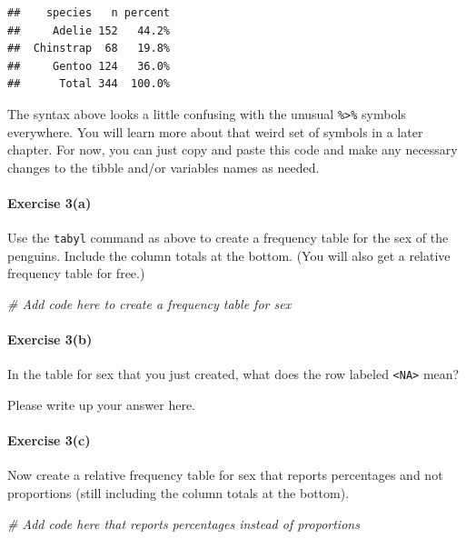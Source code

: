 \documentclass[
]{book}
\newenvironment{Shaded}{\begin{snugshade}}{\end{snugshade}}
\newcommand{\CommentTok}[1]{\textcolor[rgb]{0.56,0.35,0.01}{\textit{#1}}}
\begin{document}
\begin{verbatim}
##    species   n percent
##     Adelie 152   44.2%
##  Chinstrap  68   19.8%
##     Gentoo 124   36.0%
##      Total 344  100.0%
\end{verbatim}

The syntax above looks a little confusing with the unusual \texttt{\%\textgreater{}\%} symbols everywhere. You will learn more about that weird set of symbols in a later chapter. For now, you can just copy and paste this code and make any necessary changes to the tibble and/or variables names as needed.

\hypertarget{exercise-3a}{%
\paragraph*{Exercise 3(a)}\label{exercise-3a}}

Use the \texttt{tabyl} command as above to create a frequency table for the sex of the penguins. Include the column totals at the bottom. (You will also get a relative frequency table for free.)

\begin{Shaded}
\begin{Highlighting}[]
\CommentTok{\# Add code here to create a frequency table for sex}
\end{Highlighting}
\end{Shaded}

\hypertarget{exercise-3b}{%
\paragraph*{Exercise 3(b)}\label{exercise-3b}}

In the table for sex that you just created, what does the row labeled \texttt{\textless{}NA\textgreater{}} mean?

Please write up your answer here.

\hypertarget{exercise-3c}{%
\paragraph*{Exercise 3(c)}\label{exercise-3c}}

Now create a relative frequency table for sex that reports percentages and not proportions (still including the column totals at the bottom).

\begin{Shaded}
\begin{Highlighting}[]
\CommentTok{\# Add code here that reports percentages instead of proportions}
\end{Highlighting}
\end{Shaded}
\end{document}
